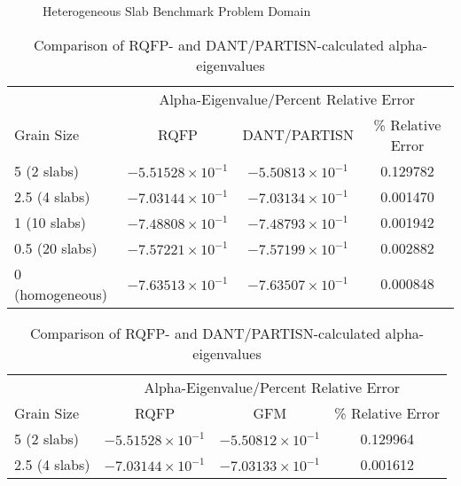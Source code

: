 \begin{figure}[H]
	\centering
	\resizebox{.75\textwidth}{!}{}
	\caption{Heterogeneous Slab Benchmark Problem Domain}
	\label{fig:HeteroSlabDomain}
\end{figure}

\begin{table}[!htbp]
	\caption{Comparison of RQFP-calculated eigenvalues to various methods for multi-region scattering slab ($M = 500$, $L = 64$, Tolerance = $10^{-12}$)}
	\label{table:RQ_DE_DANT_GFM}
	\begin{subtable}[!htbp]{1.0\textwidth}
	\centering{}
	\begin{tabular}{@{}lccc@{}}\toprule
	& \multicolumn{3}{c}{Alpha-Eigenvalue/Percent Relative Error} \\
	\cmidrule{2-4} Grain Size & RQFP & DANT/PARTISN & \% Relative Error \\
	\midrule
	5 (2 slabs) & $-5.51528 \times 10^{-1}$ & $-5.50813 \times 10^{-1}$ & 0.129782 \\ 
	2.5 (4 slabs) & $-7.03144 \times 10^{-1}$ & $-7.03134 \times 10^{-1}$ & 0.001470 \\ 
	1 (10 slabs) & $-7.48808 \times 10^{-1}$ & $-7.48793 \times 10^{-1}$ & 0.001942 \\ 
	0.5 (20 slabs) & $-7.57221 \times 10^{-1}$ & $-7.57199 \times 10^{-1}$ & 0.002882 \\ 
	0 (homogeneous) & $-7.63513 \times 10^{-1}$ & $-7.63507 \times 10^{-1}$ & 0.000848 \\ 
	\bottomrule
	\end{tabular}
	\caption{Comparison of RQFP- and DANT/PARTISN-calculated alpha-eigenvalues}
	\label{AlphaDANT}
	\end{subtable}%
	\vspace{0.25cm}
	\begin{subtable}[!htbp]{1.0\textwidth}
	\centering{}
	\begin{tabular}{@{}lccc@{}}\toprule
	& \multicolumn{3}{c}{Alpha-Eigenvalue/Percent Relative Error} \\
	\cmidrule{2-4} Grain Size & RQFP & GFM & \% Relative Error \\
	\midrule
	5 (2 slabs) & $-5.51528 \times 10^{-1}$ & $-5.50812 \times 10^{-1}$ & 0.129964 \\ 
	2.5 (4 slabs) & $-7.03144 \times 10^{-1}$ & $-7.03133 \times 10^{-1}$ & 0.001612 \\ 

\end{tabular}
\end{subtable}
\end{table}

